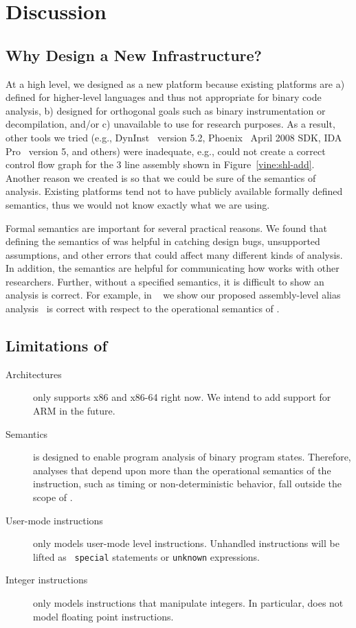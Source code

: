 \section{Discussion}
\label{vine:discussion}

\subsection{Why Design a New Infrastructure?}  

At a high level, we designed \bap as a new platform because existing
platforms are a) defined for higher-level languages and thus not
appropriate for binary code analysis, b) designed for orthogonal goals
such as binary instrumentation or decompilation, and/or c) unavailable
to use for research purposes.  As a result, other tools we tried
(e.g., DynInst~\cite{dyninst} version 5.2, Phoenix~\cite{phoenix}
April 2008 SDK, IDA Pro~\cite{idapro} version 5, and others) were
inadequate, e.g., could not create a correct control flow graph for
the 3 line assembly shown in Figure~\ref{vine:shl-add}. Another reason
we created \bap is so that we could be sure of the semantics of 
analysis. Existing platforms tend not to have publicly available
formally defined semantics, thus we would not know exactly what we are
using.

Formal semantics are important for several practical reasons. We found
that defining the semantics of \bap was helpful in catching design
bugs, unsupported assumptions, and other errors that could affect many
different kinds of analysis. In addition, the semantics are helpful
for communicating how \bap works with other researchers.  Further,
without a specified semantics, it is difficult to show an analysis is
correct. For example, in ~\cite{brumley:2006:alias} we show our
proposed assembly-level alias analysis~\cite{brumley:2006:alias} is
correct with respect to the operational semantics of \bap.


\subsection{Limitations of \bap}

\begin{description}
\item[Architectures] \bap only supports x86 and x86-64 right now.  We intend to
  add support for ARM in the future.
\item[Semantics] \bap is designed to enable program analysis of binary
  program states. Therefore, analyses that depend upon more than the
  operational semantics of the instruction, such as timing or non-deterministic behavior, fall outside the scope of
  \bap. 
\item[User-mode instructions] \bap only models user-mode level
  instructions.  Unhandled instructions will be lifted as {\tt
    special} statements or {\tt unknown} expressions.
\item[Integer instructions] \bap only models instructions that
  manipulate integers.  In particular, \bap does not model floating
  point instructions.
\end{description}

